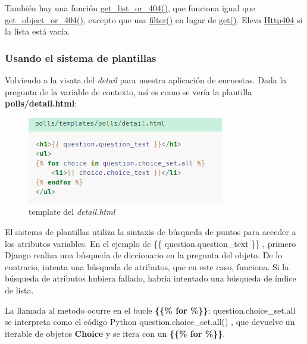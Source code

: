 \documentclass[10pt]{article}
\newcommand{\py}[1]{{\textcolor{B}{Python} #1}}
\newcommand{\django}[1]{{\textcolor{G}{Django} #1}}
\begin{document}
También hay una función {\href{https://docs.djangoproject.com/en/3.0/topics/http/shortcuts/\#django.shortcuts.get\_list\_or\_404}{\textcolor{B}{get\_list\_or\_404()}}}, que funciona igual que {\href{https://docs.djangoproject.com/en/3.0/topics/http/shortcuts/\#django.shortcuts.get\_object\_or\_404}{\textcolor{B}{get\_object\_or\_404()}}}, excepto que usa {\href{https://docs.djangoproject.com/en/3.0/ref/models/querysets/\#django.db.models.query.QuerySet.filter}{\textcolor{B}{filter()}}} en lugar de {\href{https://docs.djangoproject.com/en/3.0/ref/models/querysets/\#django.db.models.query.QuerySet.get}{\textcolor{B}{get()}}}. Eleva {\href{https://docs.djangoproject.com/en/3.0/topics/http/views/\#django.http.Http404}{\textcolor{B}{Http404}}} si la lista está vacía.			
			
\subsubsection{Usando el sistema de plantillas}

Volviendo a la visata del \textit{detail}  para nuestra aplicación de encuestas. Dada la pregunta de la variable de contexto, así es como se vería la plantilla \textbf{polls/detail.html}:

\begin{figure}[H]
\begin{center}
\includegraphics[scale=1]{figuras/3/33/335/img1.png}
\caption{template del \textit{detail.html}}
\end{center}
\end{figure}

El sistema de plantillas utiliza la sintaxis de búsqueda de puntos para acceder a los atributos variables. En el ejemplo de \textcolor{R}{ \{\{ question.question\_text \}\} }, primero \django{} realiza una búsqueda de diccionario en la pregunta del objeto. De lo contrario, intenta una búsqueda de atributos, que en este caso, funciona. Si la búsqueda de atributos hubiera fallado, habría intentado una búsqueda de índice de lista.


La llamada al metodo ocurre en el bucle \textbf{\{\{\% for \%\}\}}: \textcolor{R}{ question.choice\_set.all } se interpreta como el código \py{} \textcolor{G}{ question.choice\_set.all() }, que devuelve un iterable de objetos \textbf{Choice} y se itera con un \textbf{\{\{\% for \%\}\}}.
\end{document}
